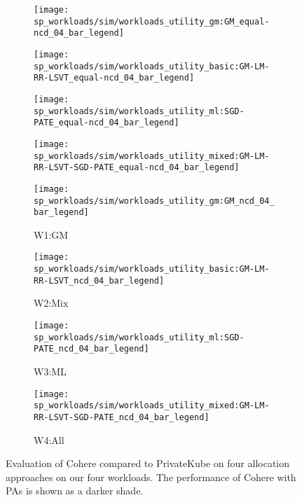 \documentclass[conference,compsoc]{IEEEtran}
\begin{document}
\begin{figure*}[ht]
    \begin{subfigure}[t]{0.24\textwidth}
        \texttt{[image: sp\_workloads/sim/workloads\_utility\_gm:GM\_equal-ncd\_04\_bar\_legend]}
    \end{subfigure}
%
    \begin{subfigure}[t]{0.24\textwidth}
        \texttt{[image: sp\_workloads/sim/workloads\_utility\_basic:GM-LM-RR-LSVT\_equal-ncd\_04\_bar\_legend]}
    \end{subfigure}
%
    \begin{subfigure}[t]{0.24\textwidth}
        \texttt{[image: sp\_workloads/sim/workloads\_utility\_ml:SGD-PATE\_equal-ncd\_04\_bar\_legend]}

    \end{subfigure}
%
    \begin{subfigure}[t]{0.24\textwidth}
        \texttt{[image: sp\_workloads/sim/workloads\_utility\_mixed:GM-LM-RR-LSVT-SGD-PATE\_equal-ncd\_04\_bar\_legend]}
    \end{subfigure}

    \vspace{0.2cm}

    \begin{subfigure}[t]{0.24\textwidth}
        \texttt{[image: sp\_workloads/sim/workloads\_utility\_gm:GM\_ncd\_04\_bar\_legend]}
        \caption{W1:GM}
    \end{subfigure}
%
    \begin{subfigure}[t]{0.24\textwidth}
        \texttt{[image: sp\_workloads/sim/workloads\_utility\_basic:GM-LM-RR-LSVT\_ncd\_04\_bar\_legend]}
        \caption{W2:Mix}
    \end{subfigure}
%
    \begin{subfigure}[t]{0.24\textwidth}
        \texttt{[image: sp\_workloads/sim/workloads\_utility\_ml:SGD-PATE\_ncd\_04\_bar\_legend]}
        \caption{W3:ML}
    \end{subfigure}
%
    \begin{subfigure}[t]{0.24\textwidth}
        \texttt{[image: sp\_workloads/sim/workloads\_utility\_mixed:GM-LM-RR-LSVT-SGD-PATE\_ncd\_04\_bar\_legend]}
        \caption{W4:All}
    \end{subfigure}
    \vspace{-2pt}
    \caption{
    Evaluation of Cohere compared to PrivateKube on four allocation approaches on our four workloads.
    The performance of Cohere with PAs is shown as a darker shade.}
\end{figure*}
\end{document}
